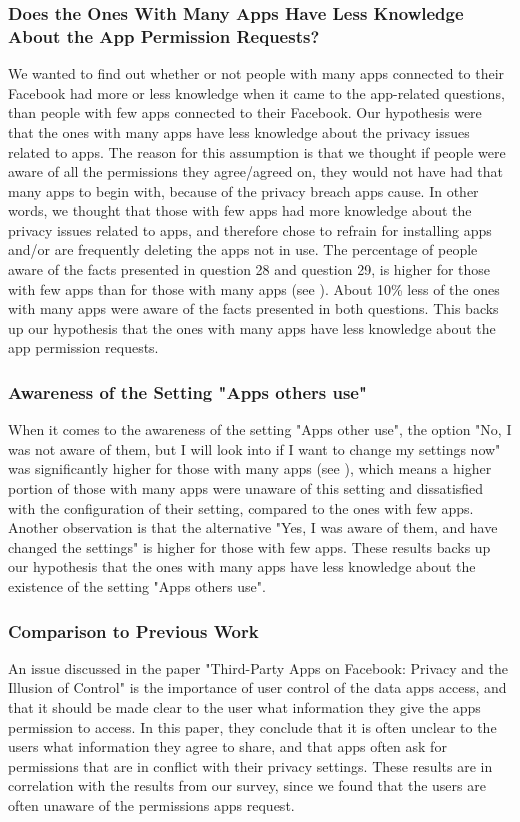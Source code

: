 \subsubsection{Does the Ones With Many Apps Have Less Knowledge About the App Permission Requests?}
We wanted to find out whether or not people with many apps connected to their Facebook had more or less knowledge when it came to the app-related questions, than people with few apps connected to their Facebook. Our hypothesis were that the ones with many apps have less knowledge about the privacy issues related to apps. The reason for this assumption is that we thought if people were aware of all the permissions they agree/agreed on, they would not have had that many apps to begin with, because of the privacy breach apps cause. In other words, we thought that those with few apps had more knowledge about the privacy issues related to apps, and therefore chose to refrain for installing apps and/or are frequently deleting the apps not in use. The percentage of people aware of the facts presented in question 28 and question 29, is higher for those with few apps than for those with many apps (see ). About 10\% less of the ones with many apps were aware of the facts presented in both questions. This backs up our hypothesis that the ones with many apps have less knowledge about the app permission requests. 

\subsubsection{Awareness of the Setting "Apps others use"}
When it comes to the awareness of the setting "Apps other use", the option "No, I was not aware of them, but I will look into if I want to change my settings now" was significantly higher for those with many apps (see ), which means a higher portion of those with many apps were unaware of this setting and dissatisfied with the configuration of their setting, compared to the ones with few apps. Another observation is that the alternative "Yes, I was aware of them, and have changed the settings" is higher for those with few apps. These results backs up our hypothesis that the ones with many apps have less knowledge about the existence of the setting "Apps others use". 

\subsubsection{Comparison to Previous Work}
An issue discussed in the paper "Third-Party Apps on Facebook: Privacy and the Illusion of Control" \cite{thirdPartyApps} is the importance of user control of the data apps access, and that it should be made clear to the user what information they give the apps permission to access. In this paper, they conclude that it is often unclear to the users what information they agree to share, and that apps often ask for permissions that are in conflict with their privacy settings. These results are in correlation with the results from our survey, since we found that the users are often unaware of the permissions apps request. 


